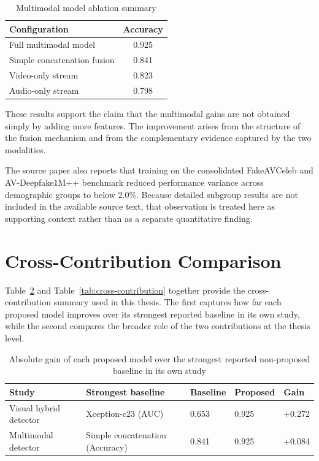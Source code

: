 \begin{table}[H]
\centering
\caption{Multimodal model ablation summary}
\label{tab:multimodal-ablation}
\begin{tabular}{l c}
\toprule
\textbf{Configuration} & \textbf{Accuracy} \\
\midrule
Full multimodal model & 0.925 \\
Simple concatenation fusion & 0.841 \\
Video-only stream & 0.823 \\
Audio-only stream & 0.798 \\
\bottomrule
\end{tabular}
\end{table}

These results support the claim that the multimodal gains are not obtained simply by adding more features. The improvement arises from the structure of the fusion mechanism and from the complementary evidence captured by the two modalities.

The source paper also reports that training on the consolidated FakeAVCeleb and AV-Deepfake1M++ benchmark reduced performance variance across demographic groups to below 2.0\%. Because detailed subgroup results are not included in the available source text, that observation is treated here as supporting context rather than as a separate quantitative finding.

\section{Cross-Contribution Comparison}

Table~\ref{tab:absolute-gains} and Table~\ref{tab:cross-contribution} together provide the cross-contribution summary used in this thesis. The first captures how far each proposed model improves over its strongest reported baseline in its own study, while the second compares the broader role of the two contributions at the thesis level.

\begin{table}[H]
\centering
\small
\caption{Absolute gain of each proposed model over the strongest reported non-proposed baseline in its own study}
\label{tab:absolute-gains}
\begin{tabular}{p{}p{}p{}p{}p{}}
\toprule
\textbf{Study} & \textbf{Strongest baseline} & \textbf{Baseline} & \textbf{Proposed} & \textbf{Gain} \\
\midrule
Visual hybrid detector & Xception-c23 (AUC) & 0.653 & 0.925 & +0.272 \\
Multimodal detector & Simple concatenation (Accuracy) & 0.841 & 0.925 & +0.084 \\
\bottomrule
\end{tabular}
\end{table}

